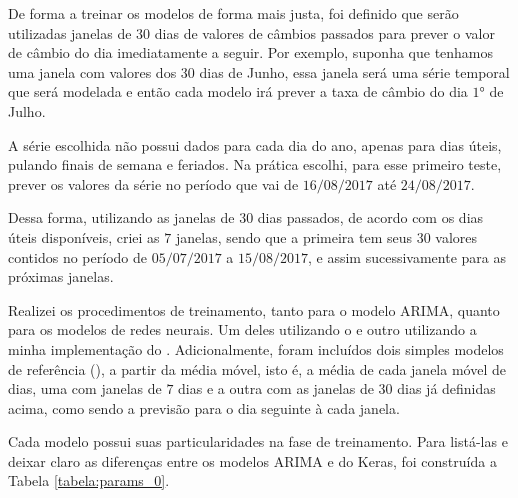 De forma a treinar os modelos de forma mais justa, foi definido que serão utilizadas janelas de $30$ dias de valores de câmbios passados para prever o valor de câmbio do dia imediatamente a seguir. Por exemplo, suponha que tenhamos uma janela com valores dos $30$ dias de Junho, essa janela será uma série temporal que será modelada e então cada modelo irá prever a taxa de câmbio do dia $1$° de Julho.

A série escolhida não possui dados para cada dia do ano, apenas para dias úteis, pulando finais de semana e feriados. Na prática escolhi, para esse primeiro teste, prever os valores da série no período que vai de $16/08/2017$ até $24/08/2017$.

Dessa forma, utilizando as janelas de $30$ dias passados, de acordo com os dias úteis disponíveis, criei as $7$ janelas, sendo que a primeira tem seus $30$ valores contidos no período de $05/07/2017$ a $15/08/2017$, e assim sucessivamente para as próximas janelas.

Realizei os procedimentos de treinamento, tanto para o modelo ARIMA, quanto para os modelos de redes neurais. Um deles utilizando o  e outro utilizando a minha implementação do . Adicionalmente, foram incluídos dois simples modelos de referência (), a partir da média móvel, isto é, a média de cada janela móvel de dias, uma com janelas de $7$ dias e a outra com as janelas de $30$ dias já definidas acima, como sendo a previsão para o dia seguinte à cada janela.

Cada modelo possui suas particularidades na fase de treinamento. Para listá-las e deixar claro as diferenças entre os modelos ARIMA e do Keras, foi construída a Tabela \ref{tabela:params_0}.

\begin{table}[]
\begin{center}
\caption{Especificação dos dados de treino e de teste ($7$ dias).}\label{tabela:params_0}
\end{center}
\end{table}

